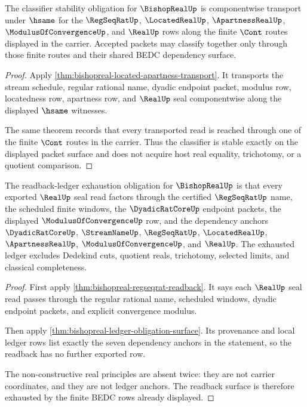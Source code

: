 \begin{theorem}
\label{thm:bishopreal-classifier-stability-obligation}
The classifier stability obligation for $\BishopRealUp$ is componentwise
transport under $\hsame$ for the $\RegSeqRatUp$, $\LocatedRealUp$,
$\ApartnessRealUp$, $\ModulusOfConvergenceUp$, and $\RealUp$ rows along the
finite $\Cont$ routes displayed in the carrier. Accepted packets may classify
together only through those finite routes and their shared BEDC dependency
surface.
\end{theorem}
\begin{proof}
Apply \autoref{thm:bishopreal-located-apartness-transport}. It transports the
stream schedule, regular rational name, dyadic endpoint packet, modulus row,
locatedness row, apartness row, and $\RealUp$ seal componentwise along the
displayed $\hsame$ witnesses.

The same theorem records that every transported read is reached through one of
the finite $\Cont$ routes in the carrier. Thus the classifier is stable exactly
on the displayed packet surface and does not acquire host real equality,
trichotomy, or a quotient comparison.
\end{proof}

\begin{theorem}
\label{thm:bishopreal-readback-ledger-exhaustion-obligation}
The readback-ledger exhaustion obligation for $\BishopRealUp$ is that every
exported $\RealUp$ seal read factors through the certified $\RegSeqRatUp$ name,
the scheduled finite windows, the $\DyadicRatCoreUp$ endpoint packets, the
displayed $\ModulusOfConvergenceUp$ row, and the dependency anchors
$\DyadicRatCoreUp$, $\StreamNameUp$, $\RegSeqRatUp$, $\LocatedRealUp$,
$\ApartnessRealUp$, $\ModulusOfConvergenceUp$, and $\RealUp$. The exhausted
ledger excludes Dedekind cuts, quotient reals, trichotomy, selected limits, and
classical completeness.
\end{theorem}
\begin{proof}
First apply \autoref{thm:bishopreal-regseqrat-readback}. It says each
$\RealUp$ seal read passes through the regular rational name, scheduled
windows, dyadic endpoint packets, and explicit convergence modulus.

Then apply \autoref{thm:bishopreal-ledger-obligation-surface}. Its provenance
and local ledger rows list exactly the seven dependency anchors in the
statement, so the readback has no further exported row.

The non-constructive real principles are absent twice: they are not carrier
coordinates, and they are not ledger anchors. The readback surface is therefore
exhausted by the finite BEDC rows already displayed.
\end{proof}

